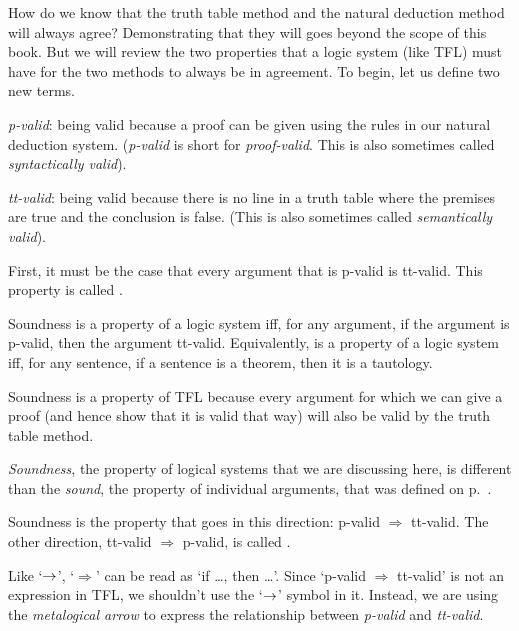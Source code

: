 How do we know that the truth table method and the natural deduction method will always agree? Demonstrating that they will goes beyond the scope of this book. But we will review the two properties that a logic system (like TFL) must have for the two methods to always be in agreement.  To begin, let us define two new terms. 
\begin{earg}
\item[] \textit{p-valid}: being valid because a proof can be given using the rules in our natural deduction system. (\textit{p-valid} is short for \textit{proof-valid}. This is also sometimes called \textit{syntactically valid}). 
\item[] \textit{tt-valid}: being valid because there is no line in a truth table where the premises are true and the conclusion is false. (This is also sometimes called \textit{semantically valid}).
\end{earg}
First, it must be the case that every argument that is p-valid is tt-valid. This property is called .

\begin{factboxy}{Soundness}\label{def:Soundness}
 is a property of a logic system iff, for any argument, if the argument is p-valid, then the argument tt-valid.
\tcblower
Equivalently,  is a property of a logic system iff, for any sentence, if a sentence is a theorem, then it is a tautology. 
\end{factboxy}

\noindent Soundness is a property of TFL because every argument for which we can give a proof (and hence show that it is valid that way) will also be valid by the truth table method.


\begin{notebox}
\textit{Soundness}, the property of logical systems that we are discussing here, is different than the \textit{sound}, the property of individual arguments, that was defined on p.~\pageref{def-sound-arg}.
\end{notebox}

Soundness is the property that goes in this direction: p-valid $\Rightarrow$ tt-valid. The other direction, tt-valid $\Rightarrow$ p-valid, is called .

\begin{notebox}
Like `$\rightarrow$', `$\Rightarrow$' can be read as `if \ldots, then \ldots'. Since `p-valid $\Rightarrow$ tt-valid' is not an expression in TFL, we shouldn't use the `$\rightarrow$' symbol in it. Instead, we are using the \textit{metalogical arrow} to express the relationship between \textit{p-valid} and \textit{tt-valid}.
\end{notebox}

